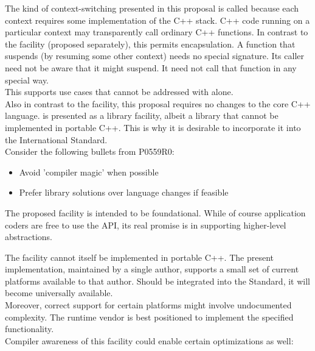\documentclass[fontsize=10pt,paper=A4,pagesize,DIV=15]{scrartcl}
\begin{document}
The kind of context-switching presented in this proposal is called
 because each context requires some implementation of the C++
stack. C++ code running on a particular context may transparently call
ordinary C++ functions. In contrast to the \bfs{\coawait}
facility (proposed separately\cite{N4649}), this permits encapsulation. A
function that suspends (by resuming some other context) needs no special
signature. Its caller need not be aware that it might suspend. It need not
call that function in any special way.\\

This supports use cases that cannot be addressed with \coawait alone.\\

Also in contrast to the \coawait facility, this proposal requires no
changes to the core C++ language. \cc is presented as a library facility,
albeit a library that cannot be implemented in portable C++. This is why it is
desirable to incorporate it into the International Standard.\\

Consider the following bullets from P0559R0:\cite{P0559R0}

\begin{itemize}
\item Avoid 'compiler magic' when possible
\item Prefer library solutions over language changes if feasible
\end{itemize}

The proposed \cc facility is intended to be foundational. While of course
application coders are free to use the \cc API, its real promise is in
supporting higher-level abstractions.


The \cc facility cannot itself be implemented in portable C++. The present
implementation,\cite{bcontext} maintained by a single author, supports a
small set of current platforms available to that author. Should \cc be
integrated into the Standard, it will become universally available.\\

Moreover, correct support for certain platforms might involve undocumented
complexity. The runtime vendor is best positioned to implement the specified
functionality.\\

Compiler awareness of this facility could enable certain optimizations as
well:
\end{document}
